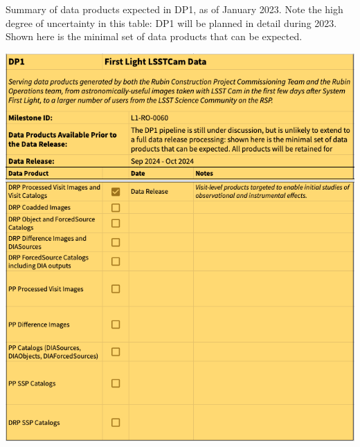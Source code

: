 \begin{table}
\caption{Summary of data products expected in DP1, as of January 2023.
Note the high degree of uncertainty in this table: DP1 will be planned in detail during 2023. Shown here is the minimal set of data products that can be expected.}
\label{tab:dp-one-products}
\includegraphics[width=\linewidth]{figures/DP1-products}
\end{table}

